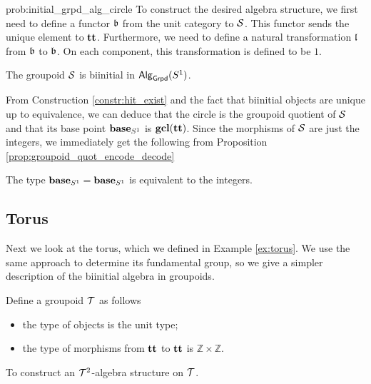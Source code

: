 \begin{construction}{prob:initial_grpd_alg_circle}
To construct the desired algebra structure, we first need to define a functor $\mathfrak{b}$ from the unit category to $\mathcal{S}$.
This functor sends the unique element to $\operatorname{\mathbf{tt}}$.
Furthermore, we need to define a natural transformation $\mathfrak{l}$ from $\mathfrak{b}$ to $\mathfrak{b}$.
On each component, this transformation is defined to be $1$.
\end{construction}

\begin{proposition}
The groupoid $\mathcal{S}$ is biinitial in $\mathsf{Alg}_{\mathsf{Grpd}}(S^1)$.
\end{proposition}

From Construction \ref{constr:hit_exist} and the fact that biinitial objects are unique up to equivalence,
we can deduce that the circle is the groupoid quotient of $\mathcal{S}$ and that its base point $\operatorname{\mathbf{base}}_{S^1}$ is $\operatorname{\mathbf{gcl}}(\operatorname{\mathbf{tt}})$.
Since the morphisms of $\mathcal{S}$ are just the integers, we immediately get the following from Proposition \ref{prop:groupoid_quot_encode_decode}

\begin{corollary}
The type $\operatorname{\mathbf{base}}_{S^1} = \operatorname{\mathbf{base}}_{S^1}$ is equivalent to the integers.
\end{corollary}

\subsection{Torus}
\label{sec:torus_fund_group}
Next we look at the torus, which we defined in Example \ref{ex:torus}.
We use the same approach to determine its fundamental group, so we give a simpler description of the biinitial algebra in groupoids.

\begin{definition}
Define a groupoid $\mathcal{T}$ as follows
\begin{itemize}
	\item the type of objects is the unit type;
	\item the type of morphisms from $\operatorname{\mathbf{tt}}$ to $\operatorname{\mathbf{tt}}$ is $\mathbb{Z} \times \mathbb{Z}$.
\end{itemize}
\end{definition}

\begin{problem}
\label{prob:initial_grpd_alg_torus}
To construct an $\mathcal{T}^2$-algebra structure on $\mathcal{T}$.
\end{problem}

